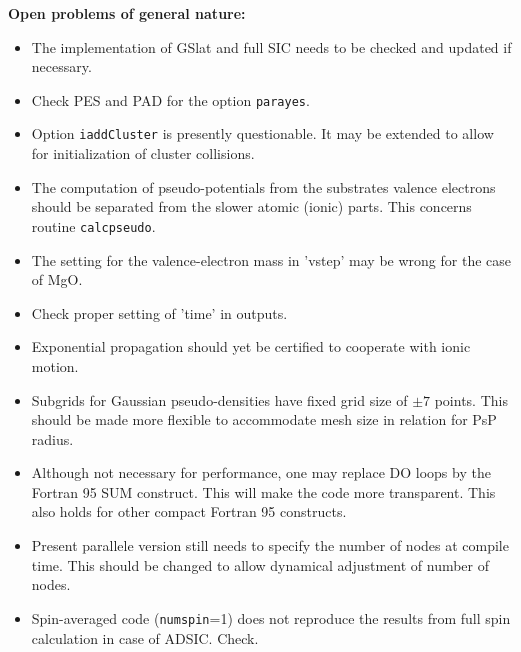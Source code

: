 \documentclass[12pt]{article}
\begin{document}
{\Large\bf Open problems of general nature:}
\begin{itemize}
  \item The implementation of GSlat and full SIC needs to be checked
        and updated if necessary.
  \item Check PES and PAD for the option  {\tt parayes}.
  \item Option {\tt iaddCluster} is presently questionable. 
        It may be extended to allow
        for initialization of cluster collisions.
  \item The computation of pseudo-potentials from the substrates
        valence electrons should be separated from the slower
        atomic (ionic) parts. This concerns routine {\tt calcpseudo}.
  \item The setting for the valence-electron mass in 'vstep'
        may be wrong for the case of MgO.
  \item Check proper setting of 'time' in outputs.
  \item Exponential propagation should yet be certified to cooperate
        with ionic motion.
  \item Subgrids for Gaussian pseudo-densities have fixed grid size
        of $\pm 7$ points. This should be made more flexible to
        accommodate mesh size in relation for PsP radius.
  \item Although not necessary for performance, one may replace
        DO loops by the Fortran 95 SUM construct. This will make the
        code more transparent. This also holds for other compact
        Fortran 95 constructs.
  \item Present parallele version  still needs to specify the number
        of nodes at compile time. This should be 
        changed to allow dynamical adjustment of number of nodes.
  \item Spin-averaged code ({\tt numspin}=1) does not reproduce 
        the results from full spin calculation in case of ADSIC.
        Check.
\end{itemize}
\end{document}
